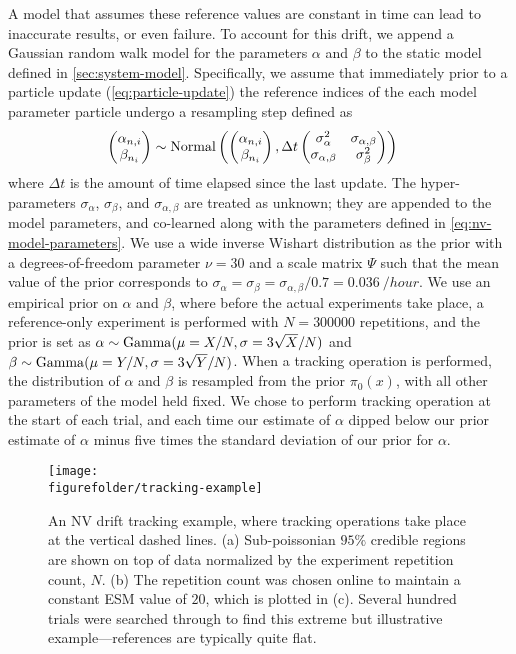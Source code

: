 \documentclass[aps,nofootinbib,twocolumn,superscriptaddress]{revtex4}
\newcommand{\figurefolder}{../fig}
\newcommand{\mps}{x}
\begin{document}
A model that assumes these reference values are constant
in time can lead to inaccurate results, or even failure.
To account for this drift,
we append a Gaussian random
walk model for the parameters $\alpha$ and $\beta$ to the static
model defined in \autoref{sec:system-model}.
Specifically, we assume that immediately prior to
a particle update (\autoref{eq:particle-update}) the reference
indices of the each model parameter particle
undergo a resampling step defined as
\begin{align}
    \begin{pmatrix}\alpha_{n,i}\\\beta_{n_i}\end{pmatrix}
        &\sim \operatorname{Normal}\left(
            \begin{pmatrix}\alpha_{n,i}\\\beta_{n_i}\end{pmatrix},
            \Delta t
            \begin{pmatrix}\sigma_\alpha^2&\sigma_{\alpha,\beta}\\\sigma_{\alpha,\beta}&\sigma_\beta^2\end{pmatrix}
            \right)
\end{align}
where $\Delta t$ is the amount of time elapsed since the last
update.
The hyper-parameters $\sigma_\alpha$, $\sigma_\beta$, and
$\sigma_{\alpha,\beta}$ are treated as unknown; they are appended to
the model parameters, and co-learned along with the parameters defined
in \autoref{eq:nv-model-parameters}.
We use a wide inverse Wishart distribution as the prior with a
degrees-of-freedom parameter $\nu=30$ and a scale matrix $\Psi$
such that the mean value of the prior corresponds to
$\sigma_\alpha=\sigma_\beta=\sigma_{\alpha,\beta}/0.7=\SI{0.036}{/hour}$.
We use an empirical prior on $\alpha$ and $\beta$, where before
the actual experiments take place, a reference-only experiment is performed
with $N=300000$ repetitions, and the prior
is set as $\alpha\sim\operatorname{Gamma}(\mu=X/N,\sigma=3\sqrt{X}/N)$
and $\beta\sim\operatorname{Gamma}(\mu=Y/N,\sigma=3\sqrt{Y}/N)$.
When a tracking operation is performed, the distribution of
$\alpha$ and $\beta$ is resampled from the prior $\pi_0(\mps)$,
with all other parameters of the model held fixed.
We chose to perform tracking operation at the start of each trial,
and each time our estimate of $\alpha$ dipped below
our prior estimate of $\alpha$ minus five times the standard
deviation of our prior for $\alpha$.


\begin{figure}
    \centering
    \texttt{[image: \\figurefolder/tracking-example]}
    \caption{An NV drift tracking example, where tracking
    operations take place at the vertical dashed lines.
    (a) Sub-poissonian $95\%$ credible regions are shown on top of data
    normalized by the experiment repetition count, $N$.
    (b) The repetition count was chosen online to maintain a
    constant ESM value of $20$, which is plotted in (c).
    Several hundred trials were searched through
    to find this extreme but illustrative example---references are typically
    quite flat.}
    \label{fig:tracking-example}
\end{figure}
\end{document}
